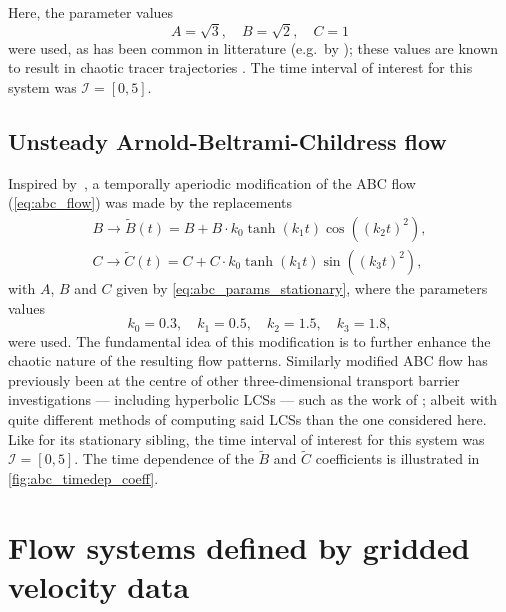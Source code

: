 Here, the parameter values
\begin{equation}
    \label{eq:abc_params_stationary}
    A = \sqrt{3},\quad B = \sqrt{2},\quad C = 1
\end{equation}
were used, as has been common in litterature (e.g.\ by
\textcite{oettinger2016autonomous}); these values are known to result in
chaotic tracer trajectories \parencite{zhao1993chaotic}. The time interval of
interest for this system was $\mathcal{I}=[0,5]$.

\subsection{Unsteady Arnold-Beltrami-Childress flow}%
\label{sub:unsteady_arnold_beltrami_childress_flow}

Inspired by~\textcite{oettinger2016autonomous}, a temporally aperiodic
modification of the ABC flow (\cref{eq:abc_flow}) was made by the replacements
\begin{equation}
    \label{eq:abc_params_nonstationary}
    \begin{gathered}
    B\to{}\widetilde{B}(t) = B + B\cdot{}k_{0}\tanh(k_{1}t)\cos({({k_{2}t})}^{2}),\\
    C\to{}\widetilde{C}(t) = C + C\cdot{}k_{0}\tanh(k_{1}t)\sin({({k_{3}t})}^{2}),
    \end{gathered}
\end{equation}
with $A$, $B$ and $C$ given by \cref{eq:abc_params_stationary}, where the
parameters values
\begin{equation}
    \label{eq:abc_params_nonstationary_frequencies}
    k_{0}=0.3,\quad k_{1}=0.5,\quad k_{2}=1.5,\quad k_{3}=1.8,
\end{equation}
were used. The fundamental idea of this modification is to further enhance
the chaotic nature of the resulting flow patterns. Similarly modified
ABC flow has previously been at the centre of other three-dimensional transport
barrier investigations --- including hyperbolic LCSs --- such as the work of
\textcite{blazevski2014hyperbolic}; albeit with quite different methods of
computing said LCSs than the one considered here. Like for its stationary
sibling, the time interval of interest for this system was $\mathcal{I}=[0,5]$.
The time dependence of the $\widetilde{B}$ and  $\widetilde{C}$ coefficients is
illustrated in \cref{fig:abc_timedep_coeff}.



\section{Flow systems defined by gridded velocity data}
\label{sec:flow_systems_defined_by_gridded_velocity_data}

